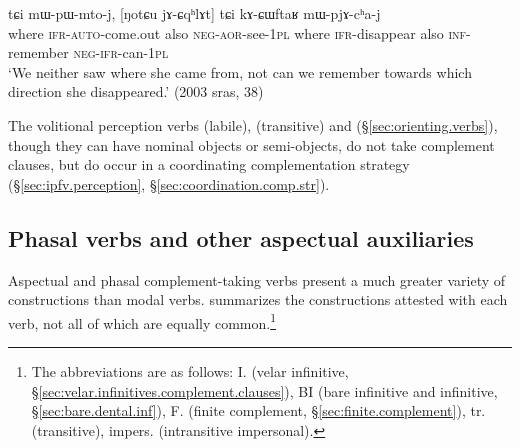 \begin{exe}
\ex \label{ex:NotCu.jAnWlhoR.mWpWmtoj}
  tɕi mɯ-pɯ-mto-j, [ŋotɕu jɤ-ɕqʰlɤt] tɕi kɤ-ɕɯftaʁ mɯ-pjɤ-cʰa-j \\
where \textsc{ifr}-\textsc{auto}-come.out also \textsc{neg}-\textsc{aor}-see-\textsc{1pl} where \textsc{ifr}-disappear also \textsc{inf}-remember \textsc{neg}-\textsc{ifr}-can-\textsc{1pl} \\
\glt `We neither saw where she came from, not can we remember towards which direction she disappeared.' (2003 sras, 38)
 \end{exe}
 
 The volitional perception verbs   (labile),  (transitive) and  (§\ref{sec:orienting.verbs}), though they can have nominal objects or semi-objects, do not take complement clauses, but do occur in a coordinating complementation strategy (§\ref{sec:ipfv.perception}, §\ref{sec:coordination.comp.str}).
 

  \subsection{Phasal verbs and other aspectual auxiliaries} \label{sec:aspectual.complement}
Aspectual and phasal complement-taking verbs present a  much greater variety of constructions than modal verbs.  summarizes the constructions attested with each verb, not all of which are equally common.\footnote{The abbreviations are as follows: 	I. (velar infinitive, §\ref{sec:velar.infinitives.complement.clauses}), BI (bare infinitive and  infinitive, §\ref{sec:bare.dental.inf}), 	F. (finite complement, §\ref{sec:finite.complement}), tr. (transitive), impers. (intransitive impersonal). }  
  

